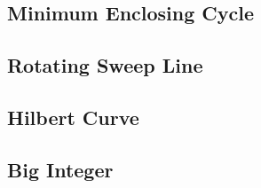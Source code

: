 \documentclass[a4paper,10pt,twocolumn,oneside]{article}
\begin{document}
\subsection{Minimum Enclosing Cycle}


\subsection{Rotating Sweep Line}


\subsection{Hilbert Curve}


\subsection{Big Integer}

\end{document}
